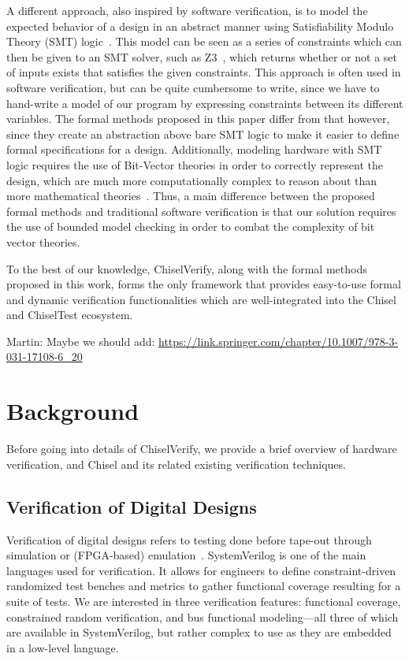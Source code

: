 \documentclass[conference]{IEEEtran}
\newcommand{\martin}[1]{{\color{blue} Martin: #1}}
\begin{document}
A different approach, also inspired by software verification, is to model the expected behavior of a design in an abstract manner using Satisfiability Modulo Theory (SMT) logic~\cite{smt}.
This model can be seen as a series of constraints which can then be given to an SMT solver, such as Z3~\cite{de2008z3}, which returns whether or not a set of inputs exists that satisfies the given constraints.
This approach is often used in software verification, but can be quite cumbersome to write, since we have to hand-write a model of our program by expressing constraints between its different variables.
The formal methods proposed in this paper differ from that however, since they create an abstraction above bare SMT logic to make it easier to define formal specifications for a design.
Additionally, modeling hardware with SMT logic requires the use of Bit-Vector theories in order to correctly represent the design, which are much more computationally complex to reason about than more mathematical theories~\cite{DecisionBitVector:1998}.
Thus, a main difference between the proposed formal methods and traditional software verification is that our solution requires the use of bounded model checking in order to combat the complexity of bit vector theories.

To the best of our knowledge, ChiselVerify, along with the formal methods proposed in this work, forms the only framework that provides easy-to-use formal and dynamic verification functionalities which are well-integrated into the Chisel and ChiselTest ecosystem.


\martin{Maybe we should add: \url{https://link.springer.com/chapter/10.1007/978-3-031-17108-6_20}}

\section{Background}
\label{sec:background}


Before going into details of ChiselVerify, we provide a brief overview of hardware verification, 
and Chisel and its related existing verification techniques.

\subsection{Verification of Digital Designs}

Verification of digital designs refers to testing done before tape-out through simulation 
or (FPGA-based) emulation~\cite{spear2008systemverilog}. SystemVerilog is one 
of the main languages used for verification. It allows for engineers to define constraint-driven 
randomized test benches and metrics to gather functional coverage resulting for a suite of 
tests. We are interested in three verification features: functional coverage, 
constrained random verification, and bus functional modeling---all three of which are available in 
SystemVerilog, but rather complex to use as they are embedded in a low-level language.
\end{document}
